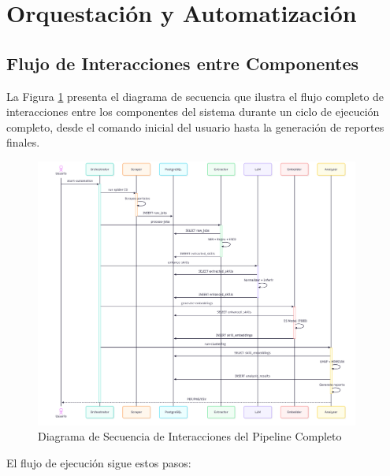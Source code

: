 \section{Orquestación y Automatización}

\subsection{Flujo de Interacciones entre Componentes}

La Figura \ref{fig:diagrama-secuencia} presenta el diagrama de secuencia que ilustra el flujo completo de interacciones entre los componentes del sistema durante un ciclo de ejecución completo, desde el comando inicial del usuario hasta la generación de reportes finales.

\begin{figure}[H]
\centering
\includegraphics[width=0.95\textwidth]{diagrams/DiagramaSecuencia.png}
\caption{Diagrama de Secuencia de Interacciones del Pipeline Completo}
\label{fig:diagrama-secuencia}
\end{figure}

El flujo de ejecución sigue estos pasos:

